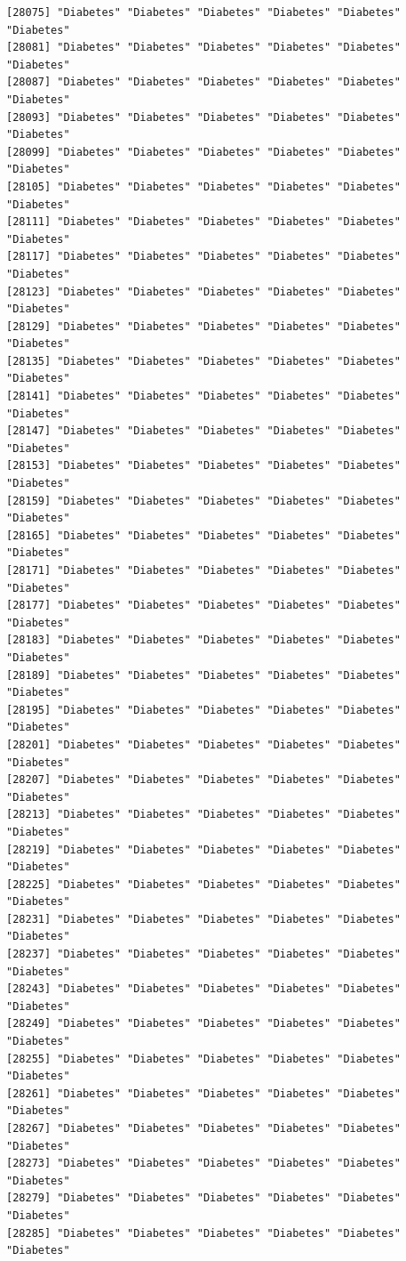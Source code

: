 \documentclass[
  letterpaper,
  DIV=11,
  numbers=noendperiod]{scrartcl}
\begin{document}
\begin{verbatim}
[28075] "Diabetes" "Diabetes" "Diabetes" "Diabetes" "Diabetes" "Diabetes"
[28081] "Diabetes" "Diabetes" "Diabetes" "Diabetes" "Diabetes" "Diabetes"
[28087] "Diabetes" "Diabetes" "Diabetes" "Diabetes" "Diabetes" "Diabetes"
[28093] "Diabetes" "Diabetes" "Diabetes" "Diabetes" "Diabetes" "Diabetes"
[28099] "Diabetes" "Diabetes" "Diabetes" "Diabetes" "Diabetes" "Diabetes"
[28105] "Diabetes" "Diabetes" "Diabetes" "Diabetes" "Diabetes" "Diabetes"
[28111] "Diabetes" "Diabetes" "Diabetes" "Diabetes" "Diabetes" "Diabetes"
[28117] "Diabetes" "Diabetes" "Diabetes" "Diabetes" "Diabetes" "Diabetes"
[28123] "Diabetes" "Diabetes" "Diabetes" "Diabetes" "Diabetes" "Diabetes"
[28129] "Diabetes" "Diabetes" "Diabetes" "Diabetes" "Diabetes" "Diabetes"
[28135] "Diabetes" "Diabetes" "Diabetes" "Diabetes" "Diabetes" "Diabetes"
[28141] "Diabetes" "Diabetes" "Diabetes" "Diabetes" "Diabetes" "Diabetes"
[28147] "Diabetes" "Diabetes" "Diabetes" "Diabetes" "Diabetes" "Diabetes"
[28153] "Diabetes" "Diabetes" "Diabetes" "Diabetes" "Diabetes" "Diabetes"
[28159] "Diabetes" "Diabetes" "Diabetes" "Diabetes" "Diabetes" "Diabetes"
[28165] "Diabetes" "Diabetes" "Diabetes" "Diabetes" "Diabetes" "Diabetes"
[28171] "Diabetes" "Diabetes" "Diabetes" "Diabetes" "Diabetes" "Diabetes"
[28177] "Diabetes" "Diabetes" "Diabetes" "Diabetes" "Diabetes" "Diabetes"
[28183] "Diabetes" "Diabetes" "Diabetes" "Diabetes" "Diabetes" "Diabetes"
[28189] "Diabetes" "Diabetes" "Diabetes" "Diabetes" "Diabetes" "Diabetes"
[28195] "Diabetes" "Diabetes" "Diabetes" "Diabetes" "Diabetes" "Diabetes"
[28201] "Diabetes" "Diabetes" "Diabetes" "Diabetes" "Diabetes" "Diabetes"
[28207] "Diabetes" "Diabetes" "Diabetes" "Diabetes" "Diabetes" "Diabetes"
[28213] "Diabetes" "Diabetes" "Diabetes" "Diabetes" "Diabetes" "Diabetes"
[28219] "Diabetes" "Diabetes" "Diabetes" "Diabetes" "Diabetes" "Diabetes"
[28225] "Diabetes" "Diabetes" "Diabetes" "Diabetes" "Diabetes" "Diabetes"
[28231] "Diabetes" "Diabetes" "Diabetes" "Diabetes" "Diabetes" "Diabetes"
[28237] "Diabetes" "Diabetes" "Diabetes" "Diabetes" "Diabetes" "Diabetes"
[28243] "Diabetes" "Diabetes" "Diabetes" "Diabetes" "Diabetes" "Diabetes"
[28249] "Diabetes" "Diabetes" "Diabetes" "Diabetes" "Diabetes" "Diabetes"
[28255] "Diabetes" "Diabetes" "Diabetes" "Diabetes" "Diabetes" "Diabetes"
[28261] "Diabetes" "Diabetes" "Diabetes" "Diabetes" "Diabetes" "Diabetes"
[28267] "Diabetes" "Diabetes" "Diabetes" "Diabetes" "Diabetes" "Diabetes"
[28273] "Diabetes" "Diabetes" "Diabetes" "Diabetes" "Diabetes" "Diabetes"
[28279] "Diabetes" "Diabetes" "Diabetes" "Diabetes" "Diabetes" "Diabetes"
[28285] "Diabetes" "Diabetes" "Diabetes" "Diabetes" "Diabetes" "Diabetes"

\end{verbatim}
\end{document}

